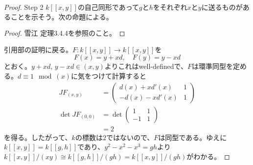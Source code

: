 \begin{proof}
\item[Step 2] $k[[x,y]]$の自己同形であって$g$と$h$をそれぞれ$x$と$y$に送るものがあることを示そう。次の命題による。
\begin{proof}
  雪江\cite{雪江3} 定理3.4.4を参照のこと。
\end{proof}
引用部の証明に戻る。$F \colon k[[x,y]] \to k[[x,y]]$を
\[
F(x) = y + xd, \quad F(y) = y - xd
\]
とおく。$y + xd$, $y - xd \in (x,y)$よりこれはwell-definedで、$F$は環準同型を定める。$d \equiv 1 \mod (x)$に気をつけて計算すると
\begin{align*}
  JF_{(x,y)} &= \begin{pmatrix}
   d(x) + xd'(x) & 1 \\
  -d(x) - xd'(x) & 1
\end{pmatrix} \\
\det JF_{(0,0)} &= \det \begin{pmatrix}
1 & 1 \\
-1 & 1
\end{pmatrix} \\
&= 2
\end{align*}
を得る。したがって、$k$の標数は$2$ではないので、$F$は同型である。ゆえに$k[[x,y]] = k[[g,h]]$であり、$y^2 - x^2 - x^3 = gh$より$k[[x,y]] /(xy) \cong k[[g,h]]/ (gh) = k[[x,y]]/ (gh)$がわかる。
\end{proof}
